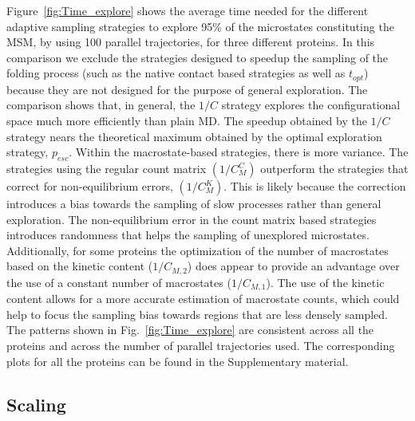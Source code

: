 Figure~\ref{fig:Time_explore} shows the average time needed for the different
adaptive sampling strategies to explore 95\% of the microstates constituting the
MSM, by using 100 parallel trajectories, for three different proteins.
In this comparison we exclude the strategies designed to speedup the sampling
of the folding process (such as the native contact based strategies as well as
$t_{opt}$) because they are not designed for the purpose of general exploration.
The comparison shows that, in general, the $1/C$ strategy explores the
configurational space much more efficiently than plain MD. The speedup obtained
by the $1/C$ strategy nears the theoretical maximum obtained by the optimal
exploration strategy, $p_{esc}$. Within the macrostate-based strategies, there
is more variance. The strategies using the regular count matrix $(1/C_M^C)$ outperform
the strategies that correct for non-equilibrium errors, $(1/C_M^K)$. This is
likely because the correction introduces a bias towards the sampling of slow
processes rather than general exploration. The non-equilibrium error in the
count matrix based strategies introduces randomness that helps the sampling of
unexplored microstates. Additionally, for some proteins the optimization of the number of
macrostates based on the kinetic content ($1/C_{M, 2}$) does appear to provide
an advantage over the use of a constant number of macrostates ($1/C_{M, 1}$). 
The use of the kinetic content allows for a more accurate estimation of
macrostate counts, which could help to focus the sampling bias towards regions
that are less densely sampled. 
The patterns shown in Fig.~\ref{fig:Time_explore}
are consistent across all the proteins and across the number of
parallel trajectories used. The corresponding plots for all the proteins can be
found in the Supplementary material.

\subsection{\label{sec:scaling}Scaling}


